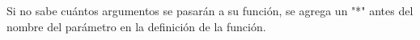 
\question \tf[V] Si no sabe cuántos argumentos se pasarán a su función, se
          agrega un "*" antes del nombre del parámetro en la definición de
          la función.
